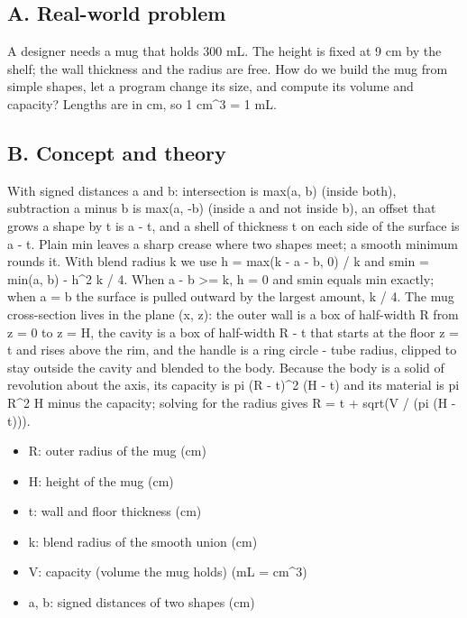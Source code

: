 \documentclass[11pt,a4paper]{article}
\begin{document}
\subsection*{A. Real-world problem}
A designer needs a mug that holds 300 mL. The height is fixed at 9 cm by the shelf; the wall thickness and the radius are free. How do we build the mug from simple shapes, let a program change its size, and compute its volume and capacity? Lengths are in cm, so 1 cm\textasciicircum{}3 = 1 mL.

\subsection*{B. Concept and theory}
With signed distances a and b: intersection is max(a, b) (inside both), subtraction a minus b is max(a, -b) (inside a and not inside b), an offset that grows a shape by t is a - t, and a shell of thickness t on each side of the surface is \textbar{}a\textbar{} - t. Plain min leaves a sharp crease where two shapes meet; a smooth minimum rounds it. With blend radius k we use h = max(k - \textbar{}a - b\textbar{}, 0) / k and smin = min(a, b) - h\textasciicircum{}2 k / 4. When \textbar{}a - b\textbar{} \textgreater{}= k, h = 0 and smin equals min exactly; when a = b the surface is pulled outward by the largest amount, k / 4. The mug cross-section lives in the plane (x, z): the outer wall is a box of half-width R from z = 0 to z = H, the cavity is a box of half-width R - t that starts at the floor z = t and rises above the rim, and the handle is a ring \textbar{}circle\textbar{} - tube radius, clipped to stay outside the cavity and blended to the body. Because the body is a solid of revolution about the axis, its capacity is pi (R - t)\textasciicircum{}2 (H - t) and its material is pi R\textasciicircum{}2 H minus the capacity; solving for the radius gives R = t + sqrt(V / (pi (H - t))).

\begin{itemize}[nosep]
\item R: outer radius of the mug (cm)
\item H: height of the mug (cm)
\item t: wall and floor thickness (cm)
\item k: blend radius of the smooth union (cm)
\item V: capacity (volume the mug holds) (mL = cm\textasciicircum{}3)
\item a, b: signed distances of two shapes (cm)
\end{itemize}
\end{document}
